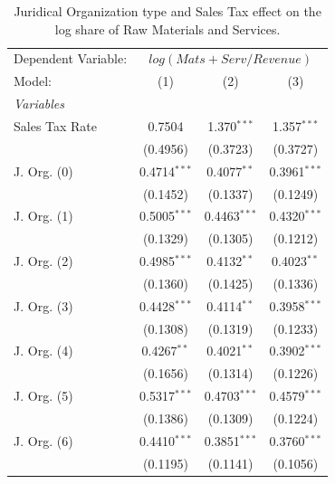 \documentclass[
  12pt]{article}
\begin{document}
\begin{table}

\caption{\label{tbl-reg-mats}Juridical Organization type and Sales Tax
effect on the log share of Raw Materials and
Services.}\begin{minipage}[t]{\linewidth}
\subcaption{\label{tbl-reg-mats-1}}

{\centering 

\begingroup
\centering
\begin{tabular}{lccc}
   \tabularnewline \midrule \midrule
   Dependent Variable: & \multicolumn{3}{c}{\(log(Mats+Serv/Revenue)\)}\\
   Model:         & (1)            & (2)            & (3)\\  
   \midrule
   \emph{Variables}\\
   Sales Tax Rate & 0.7504         & 1.370$^{***}$  & 1.357$^{***}$\\   
                  & (0.4956)       & (0.3723)       & (0.3727)\\   
   J. Org. (0)    & 0.4714$^{***}$ & 0.4077$^{**}$  & 0.3961$^{***}$\\   
                  & (0.1452)       & (0.1337)       & (0.1249)\\   
   J. Org. (1)    & 0.5005$^{***}$ & 0.4463$^{***}$ & 0.4320$^{***}$\\   
                  & (0.1329)       & (0.1305)       & (0.1212)\\   
   J. Org. (2)    & 0.4985$^{***}$ & 0.4132$^{**}$  & 0.4023$^{**}$\\   
                  & (0.1360)       & (0.1425)       & (0.1336)\\   
   J. Org. (3)    & 0.4428$^{***}$ & 0.4114$^{**}$  & 0.3958$^{***}$\\   
                  & (0.1308)       & (0.1319)       & (0.1233)\\   
   J. Org. (4)    & 0.4267$^{**}$  & 0.4021$^{**}$  & 0.3902$^{***}$\\   
                  & (0.1656)       & (0.1314)       & (0.1226)\\   
   J. Org. (5)    & 0.5317$^{***}$ & 0.4703$^{***}$ & 0.4579$^{***}$\\   
                  & (0.1386)       & (0.1309)       & (0.1224)\\   
   J. Org. (6)    & 0.4410$^{***}$ & 0.3851$^{***}$ & 0.3760$^{***}$\\   
                  & (0.1195)       & (0.1141)       & (0.1056)\\   

\end{tabular}}
\end{minipage}
\end{table}
\end{document}
